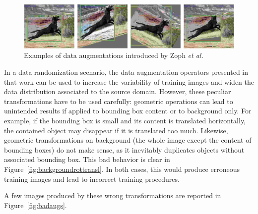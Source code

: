 \documentclass[%
    corpo=12pt,
    twoside,
    stile=classica,   
    tipotesi=magistrale,
    evenboxes,
    english,
	numerazioneromana,
]{toptesi}
\begin{document}
\begin{figure}[ht!]
	\centering
	\includegraphics[width=0.9\linewidth]{imgs/learndataaug.png}
	\caption{Examples of data augmentations introduced by Zoph \textit{et al.}\cite{zoph2019learning}}
	\label{fig:learndataaug}
\end{figure}

In a data randomization scenario, the data augmentation operators presented in that work can be used to increase the variability of training images and widen the data distribution associated to the source domain. However, these peculiar transformations have to be used carefully: geometric operations can lead to unintended results if applied to bounding box content or to background only. For example, if the bounding box is small and its content is translated horizontally, the contained object may disappear if it is translated too much. Likewise, geometric transformations on background (the whole image except the content of bounding boxes) do not make sense, as it inevitably duplicates objects without associated bounding box. This bad behavior is clear in Figure~\ref{fig:backgroundrottransl}. In both cases, this would produce erroneous training images and lead to incorrect training procedures.

A few images produced by these wrong transformations are reported in Figure~\ref{fig:badaugs}.
\end{document}
